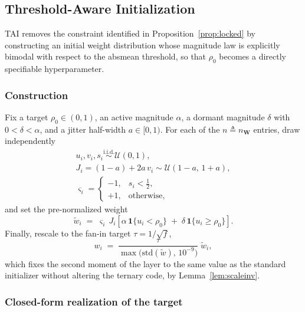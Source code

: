 \documentclass[final,5p,times,twocolumn]{elsarticle}
\theoremstyle{remark}
\newcommand{\Wm}{\mathbf{W}}
\newcommand{\rhoz}{\rho_{0}}
\begin{document}
\subsection{Threshold-Aware Initialization}
\label{sec:tai}

TAI removes the constraint identified in Proposition~\ref{prop:locked} by
constructing an initial weight distribution whose magnitude law is explicitly
bimodal with respect to the absmean threshold, so that $\rhoz$ becomes a
directly specifiable hyperparameter.

\subsubsection{Construction}

Fix a target $\rhoz \in (0,1)$, an active magnitude $\alpha$, a dormant
magnitude $\delta$ with $0 < \delta < \alpha$, and a jitter half-width
$a \in [0,1)$. For each of the $n \triangleq n_{\Wm}$ entries, draw independently
\begin{equation}
\label{eq:taidraws}
\begin{gathered}
u_{i}, v_{i}, s_{i} \stackrel{\text{i.i.d.}}{\sim} \mathcal{U}(0,1),\\[0.4ex]
J_{i} = (1-a) + 2a\,v_{i} \sim \mathcal{U}(1-a,\,1+a),\\[0.6ex]
\varsigma_{i} = \begin{cases} -1, & s_{i} < \tfrac{1}{2},\\ +1, & \text{otherwise,}\end{cases}
\end{gathered}
\end{equation}
and set the pre-normalized weight
\begin{equation}
\label{eq:taivals}
\tilde{w}_{i} \;=\; \varsigma_{i} \, J_{i}
\left[\alpha \, \mathbf{1}\{u_{i} < \rhoz\} \;+\;
\delta \, \mathbf{1}\{u_{i} \geq \rhoz\}\right].
\end{equation}
Finally, rescale to the fan-in target $\tau = 1/\sqrt{f}$,
\begin{equation}
\label{eq:tainorm}
w_{i} \;=\; \frac{\tau}{\max\big(\mathrm{std}(\tilde{w}),\,10^{-9}\big)}\;
\tilde{w}_{i},
\end{equation}
which fixes the second moment of the layer to the same value as the standard
initializer without altering the ternary code, by Lemma~\ref{lem:scaleinv}.

\subsubsection{Closed-form realization of the target}
\end{document}
